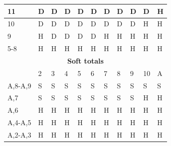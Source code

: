 \documentclass[conference]{IEEEtran}
\begin{document}
\begin{table}[ht]
\begin{tabular}{|l|l|l|l|l|l|l|l|l|l|l|}
11                           & \cellcolor{blue!25}D & \cellcolor{blue!25}D & \cellcolor{blue!25}D & \cellcolor{blue!25}D & \cellcolor{blue!25}D & \cellcolor{blue!25}D & \cellcolor{blue!25}D & \cellcolor{blue!25}D & \cellcolor{blue!25}D & \cellcolor{green!50}H  \\ \hline
10                           & \cellcolor{blue!25}D & \cellcolor{blue!25}D & \cellcolor{blue!25}D & \cellcolor{blue!25}D & \cellcolor{blue!25}D & \cellcolor{blue!25}D & \cellcolor{blue!25}D & \cellcolor{blue!25}D & \cellcolor{green!50}H & \cellcolor{green!50}H \\ \hline
9                            & \cellcolor{green!50}H & \cellcolor{blue!25}D & \cellcolor{blue!25}D & \cellcolor{blue!25}D & \cellcolor{blue!25}D & \cellcolor{green!50}H & \cellcolor{green!50}H & \cellcolor{green!50}H & \cellcolor{green!50}H & \cellcolor{green!50}H  \\ \hline
5-8                          & \cellcolor{green!50}H & \cellcolor{green!50}H & \cellcolor{green!50}H & \cellcolor{green!50}H & \cellcolor{green!50}H & \cellcolor{green!50}H & \cellcolor{green!50}H & \cellcolor{green!50}H & \cellcolor{green!50}H & \cellcolor{green!50}H \\ \hline \hline

\multicolumn{11}{|c|}{\textbf{Soft totals}}                           \\ \hline
                             & 2 & 3 & 4 & 5 & 6 & 7 & 8 & 9 & 10 & A \\ \hline
A,8-A,9                      & \cellcolor{red!75}S & \cellcolor{red!75}S & \cellcolor{red!75}S & \cellcolor{red!75}S & \cellcolor{red!75}S & \cellcolor{red!75}S & \cellcolor{red!75}S & \cellcolor{red!75}S & \cellcolor{red!75}S & \cellcolor{red!75}S  \\ \hline
A,7                          & \cellcolor{red!75}S & \cellcolor{red!75}S & \cellcolor{red!75}S & \cellcolor{red!75}S & \cellcolor{red!75}S & \cellcolor{red!75}S & \cellcolor{red!75}S & \cellcolor{red!75}S & \cellcolor{green!50}H & \cellcolor{green!50}H  \\ \hline
A,6                          & \cellcolor{green!50}H & \cellcolor{green!50}H & \cellcolor{green!50}H & \cellcolor{green!50}H & \cellcolor{green!50}H & \cellcolor{green!50}H & \cellcolor{green!50}H & \cellcolor{green!50}H & \cellcolor{green!50}H & \cellcolor{green!50}H  \\ \hline
A,4-A,5                      & \cellcolor{green!50}H & \cellcolor{green!50}H & \cellcolor{green!50}H & \cellcolor{green!50}H & \cellcolor{green!50}H & \cellcolor{green!50}H & \cellcolor{green!50}H & \cellcolor{green!50}H & \cellcolor{green!50}H & \cellcolor{green!50}H  \\ \hline
A,2-A,3                      & \cellcolor{green!50}H & \cellcolor{green!50}H & \cellcolor{green!50}H & \cellcolor{green!50}H & \cellcolor{green!50}H & \cellcolor{green!50}H & \cellcolor{green!50}H & \cellcolor{green!50}H & \cellcolor{green!50}H & \cellcolor{green!50}H  \\ \hline \hline


\end{tabular}
\end{table}
\end{document}
